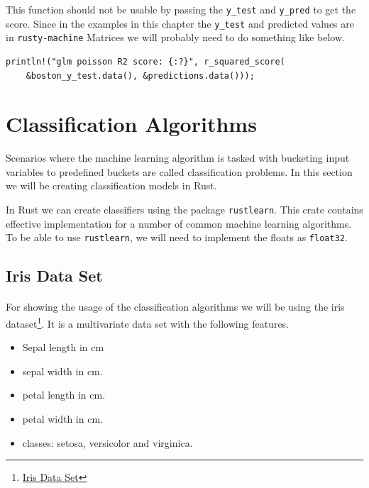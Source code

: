\documentclass{book}
\begin{document}
This function should not be usable by passing the \lstinline{y_test} and \lstinline{y_pred} to get the score. Since in the examples in this chapter the \lstinline{y_test} and predicted values are in \lstinline{rusty-machine} Matrices we will probably need to do something like below.

\begin{lstlisting}[caption={chapter2\\/rustlymachine\_regression/src\\/glms\\.rs}]
println!("glm poisson R2 score: {:?}", r_squared_score(
    &boston_y_test.data(), &predictions.data()));
\end{lstlisting}
\label{sub:r_squared_error}

\label{sub:evaluation_of_rusty_machine_models}

\section{Classification Algorithms}%

Scenarios where the machine learning algorithm is tasked with bucketing input variables to predefined buckets are called classification problems. In this section we will be creating classification models in Rust.

In Rust we can create classifiers using the package \lstinline{rustlearn}. This crate contains effective implementation for a number of common machine learning algorithms. To be able to use \lstinline{rustlearn}, we will need to implement the floats as \lstinline{float32}.

\subsection{Iris Data Set}%

\paragraph{}%
For showing the usage of the classification algorithms we will be using the iris dataset\footnote{\href{https://archive.ics.uci.edu/ml/datasets/iris}{Iris Data Set}}. It is a multivariate data set with the following features.

\begin{itemize}
	\item Sepal length in cm
	\item sepal width in cm.
	\item petal length in cm.
	\item petal width in cm.
	\item classes: setosa, versicolor and virginica.
\end{itemize}
\end{document}
